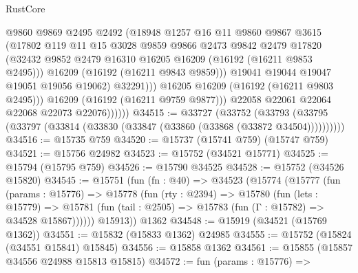 \begin{lexlean}{RustCore}
\begin{coremodule}
                          @9860
                          @9869
                          @2495
                          @2492
                          (@18948
                            @1257
                            @16
                            @11
                            @9860
                            @9867
                            @3615
                            (@17802
                              @119
                              @11
                              @15
                              @3028
                              @9859
                              @9866
                              @2473
                              @9842
                              @2479
                              @17820
                              (@32432
                                @9852
                                @2479
                                @16310
                                @16205
                                @16209
                                (@16192 (@16211 @9853 @2495)))
                              @16209
                              (@16192 (@16211 @9843 @9859)))
                            @19041
                            @19044
                            @19047
                            @19051
                            @19056
                            @19062)
                          @32291)))
                    @16205
                    @16209
                    (@16192 (@16211 @9803 @2495)))
                  @16209
                  (@16192 (@16211 @9759 @9877)))
                @22058
                @22061
                @22064
                @22068
                @22073
                @22076))))))
@34515 := @33727
    (@33752 (@33793 (@33795 (@33797 (@33814 (@33830 (@33847 (@33860 (@33868 (@33872 @34504))))))))))
@34516 := @15735 @759
@34520 := @15737 (@15741 @759) (@15747 @759)
@34521 := @15756 @24982
@34523 := @15752 (@34521 @15771)
@34525 := @15794 (@15795 @759)
@34526 := @15790 @34525
@34528 := @15752 (@34526 @15820)
@34545 := @15751
    (fun (fn : @40) =>
    @34523
      (@15774
        (@15777
          (fun (params : @15776) =>
          @15778
            (fun (rty : @2394) =>
            @15780
              (fun (lets : @15779) =>
              @15781 (fun (tail : @2505) => @15783 (fun (Γ : @15782) => @34528 @15867))))))
        @15913))
    @1362
@34548 := @15919 (@34521 (@15769 @1362))
@34551 := @15832 (@15833 @1362) @24985
@34555 := @15752 (@15824 (@34551 @15841) @15845)
@34556 := @15858 @1362
@34561 := @15855 (@15857 @34556 @24988 @15813 @15815)
@34572 := fun (params : @15776) =>

\end{coremodule}
\end{lexlean}

